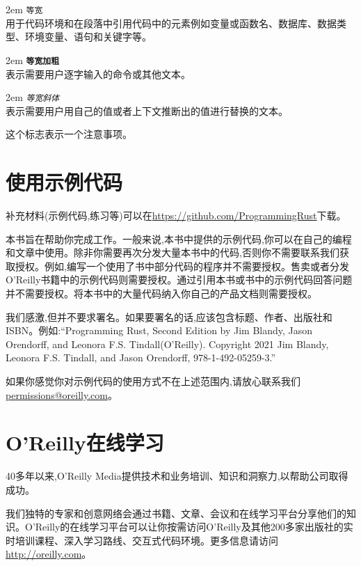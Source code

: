 \hangindent 2em
\noindent
\texttt{等宽}\\
用于代码环境和在段落中引用代码中的元素例如变量或函数名、数据库、数据类型、环境变量、语句和关键字等。

\hangindent 2em
\noindent
\textbf{\texttt{等宽加粗}}\\
表示需要用户逐字输入的命令或其他文本。

\hangindent 2em
\noindent
\emph{\texttt{等宽斜体}}\\
表示需要用户用自己的值或者上下文推断出的值进行替换的文本。

\begin{note}
    这个标志表示一个注意事项。
\end{note}

\section*{使用示例代码}
补充材料(示例代码,练习等)可以在\url{https://github.com/ProgrammingRust}下载。

本书旨在帮助你完成工作。一般来说,本书中提供的示例代码,你可以在自己的编程和文章中使用。除非你需要再次分发大量本书中的代码,否则你不需要联系我们获取授权。例如,编写一个使用了书中部分代码的程序并不需要授权。售卖或者分发O'Reilly书籍中的示例代码则需要授权。通过引用本书或书中的示例代码回答问题并不需要授权。将本书中的大量代码纳入你自己的产品文档则需要授权。

我们感激,但并不要求署名。如果要署名的话,应该包含标题、作者、出版社和ISBN。例如:“Programming Rust, Second Edition by Jim Blandy, Jason Orendorff, and Leonora F.S. Tindall(O’Reilly). Copyright 2021 Jim Blandy, Leonora F.S. Tindall, and Jason Orendorff, 978-1-492-05259-3.”

如果你感觉你对示例代码的使用方式不在上述范围内,请放心联系我们\url{permissions@oreilly.com}。

\section*{O'Reilly在线学习}
\begin{note}
    40多年以来,O'Reilly Media提供技术和业务培训、知识和洞察力,以帮助公司取得成功。
\end{note}

我们独特的专家和创意网络会通过书籍、文章、会议和在线学习平台分享他们的知识。O'Reilly的在线学习平台可以让你按需访问O'Reilly及其他200多家出版社的实时培训课程、深入学习路线、交互式代码环境。更多信息请访问\url{http://oreilly.com}。

